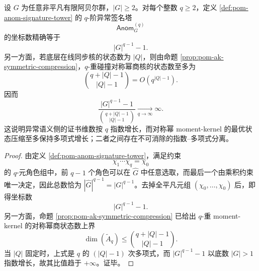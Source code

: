\begin{corollary}\label{cor:pom-anom-signature-tower-sympower-complexity-separation}
设 \(G\) 为任意非平凡有限阿贝尔群，\(|G|\ge 2\)。对每个整数 \(q\ge 2\)，定义 \ref{def:pom-anom-signature-tower} 的 \(q\)-阶异常签名塔
\[
\mathsf{Anom}^{(q)}_G
\]
的坐标数精确等于
\[
\boxed{
|G|^{q-1}-1.
}
\]
另一方面，若底层在线同步核的状态数为 \(|Q|\)，则由命题 \ref{prop:pom-ak-symmetric-compression}，\(q\)-重碰撞对称幂商核的状态数至多为
\[
\boxed{
\binom{q+|Q|-1}{|Q|-1}=O\!\left(q^{|Q|-1}\right).
}
\]
因而
\[
\boxed{
\frac{|G|^{q-1}-1}{\binom{q+|Q|-1}{|Q|-1}}
\xrightarrow[q\to\infty]{}
\infty.
}
\]
这说明异常语义侧的证书维数按 \(q\) 指数增长，而对称幂 moment-kernel 的最优状态压缩至多保持多项式增长；二者之间存在不可消除的指数--多项式分离。
\end{corollary}
\begin{proof}
由定义 \ref{def:pom-anom-signature-tower}，满足约束
\[
\chi_1\cdots\chi_q=\chi_0
\]
的 \(q\)-元角色组中，前 \(q-1\) 个角色可以在 \(\widehat G\) 中任意选取，而最后一个由乘积约束唯一决定，因此总数恰为 \(|\widehat G|^{q-1}=|G|^{q-1}\)。去掉全平凡元组 \((\chi_0,\dots,\chi_0)\) 后，即得坐标数
\[
|G|^{q-1}-1.
\]
另一方面，命题 \ref{prop:pom-ak-symmetric-compression} 已给出 \(q\)-重 moment-kernel 的对称幂商状态数上界
\[
\dim(\widetilde A_q)\le \binom{q+|Q|-1}{|Q|-1}.
\]
当 \(|Q|\) 固定时，上式是 \(q\) 的 \((|Q|-1)\) 次多项式，而 \(|G|^{q-1}-1\) 以底数 \(|G|>1\) 指数增长，故其比值趋于 \(+\infty\)。证毕。
\end{proof}

